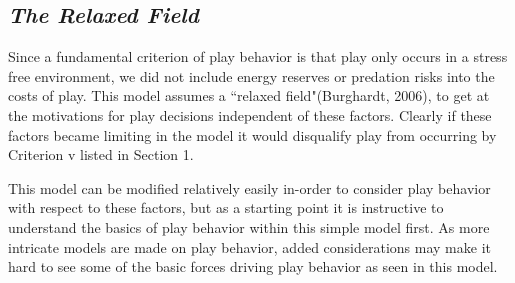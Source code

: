 \documentclass[12pt,letterpaper]{article}
\begin{document}
  \subsection{\it The Relaxed Field}
    Since a fundamental criterion of play behavior is that play only occurs in a stress free environment, we did not include energy reserves or predation risks into the costs of play. 
    This model assumes a ``relaxed field"(Burghardt, 2006), to get at the motivations for play decisions independent of these factors.
    Clearly if these factors became limiting in the model it would disqualify play from occurring by Criterion v listed in Section 1.

    This model can be modified relatively easily in-order to consider play behavior with respect to these factors, but as a starting point it is instructive to understand the basics of play behavior within this simple model first.
    As more intricate models are made on play behavior, added considerations may make it hard to see some of the basic forces driving play behavior as seen in this model.
\end{document}
